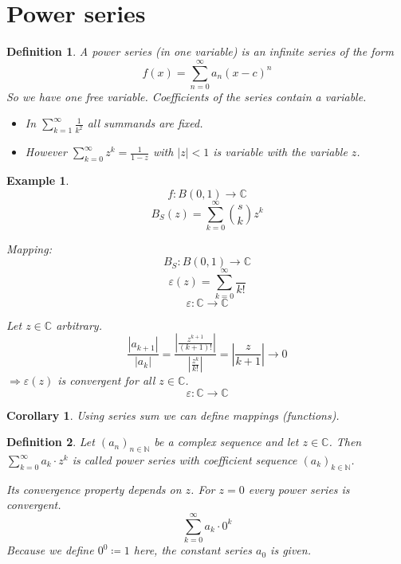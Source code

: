 \documentclass[a4paper,landscape,twocolumn]{article}
\newtheorem{defi}{Definition}
\newtheorem{ex}{Example}
\newtheorem{cor}{Corollary}
\newcommand\abs[1]{\left|#1\right|}
\newcommand\seq[1]{{\left(#1\right)}_{n \in \mathbb N}}
\begin{document}
\section{Power series}
\begin{defi}
  A power series (in one variable) is an infinite series of the form
  \[ f(x) = \sum_{n=0}^\infty a_n (x - c)^n \]
  So we have one free variable. Coefficients of the series contain a variable.

  \begin{itemize}
    \item In $\sum_{k=1}^\infty \frac{1}{k^2}$ all summands are fixed.
    \item However $\sum_{k=0}^\infty z^k = \frac{1}{1 - z}$ with $\abs{z} < 1$
      is variable with the variable $z$.
  \end{itemize}
\end{defi}
\begin{ex}
  \[ f: B(0,1) \rightarrow \mathbb C \]
  \[ B_S(z) = \sum_{k=0}^\infty {s \choose k} z^k \]

  Mapping:
  \[ B_S: B(0,1) \rightarrow \mathbb C \]
  \[ \varepsilon(z) = \sum_{k=0}^\infty \frac{}{k!} \] %
  \[ \varepsilon: \mathbb C \rightarrow \mathbb C \]

  Let $z \in \mathbb C$ arbitrary.
  \[
    \frac{\abs{a_{k+1}}}{\abs{a_k}}
    = \frac{\abs{\frac{z^{k+1}}{(k+1)!}}}{\abs{\frac{z^k}{k!}}}
    = \abs{\frac{z}{k+1}}
    \to 0
  \]
  $\Rightarrow \varepsilon(z)$ is convergent for all $z \in \mathbb C$.
  \[ \varepsilon: \mathbb C \to \mathbb C \]
\end{ex}
\begin{cor}
  Using series sum we can define mappings (functions).
\end{cor}
\begin{defi}
  Let $\seq{a_n}$ be a complex sequence and let $z \in \mathbb C$.
  Then $\sum_{k=0}^\infty a_k \cdot z^k$ is called \emph{power series with
  coefficient sequence $\left(a_k\right)_{k \in \mathbb N}$}.

  Its convergence property depends on $z$.
  For $z = 0$ every power series is convergent.
  \[ \sum_{k=0}^\infty a_k \cdot 0^k \]
  Because we define $0^0 \coloneqq 1$ here, the constant series $a_0$ is given.
\end{defi}
\end{document}
